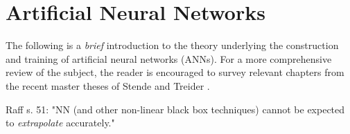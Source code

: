 \documentclass[../../master.tex]{subfiles}
\begin{document}
\chapter{Artificial Neural Networks \label{NN}}
The following is a \emph{brief} introduction to the theory underlying the construction and training of artificial neural networks (ANNs). For a more comprehensive review of the subject, the reader is encouraged to survey relevant chapters from the recent master theses of Stende and Treider \cite{stende,treider}. 


Raff s. 51: "NN (and other non-linear black box techniques) cannot be expected to \emph{extrapolate} accurately."
\end{document}
